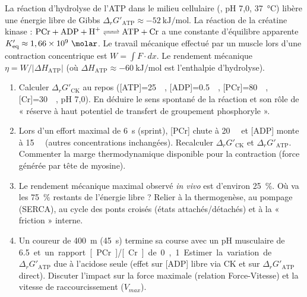 \documentclass[11pt]{article}
\begin{document}
\begin{exercice}
La réaction d'hydrolyse de l'ATP dans le milieu cellulaire (, pH 7,0, \SI{37}{\celsius}) libère une énergie libre de Gibbs $\Delta_r G'_{\text{ATP}} \approx \SI{-52}{\kilo\joule\per\mole}$. La réaction de la créatine kinase : $\ce{PCr + ADP + H+ <=> ATP + Cr}$ a une constante d'équilibre apparente $K'_{\text{eq}} \approx 1,66 \times 10^9\ \SI{}{\per\molar}$.
Le travail mécanique effectué par un muscle lors d'une contraction concentrique est $W = \int F \cdot dx$. Le rendement mécanique $\eta = W / |\Delta H_{\text{ATP}}|$ (où $\Delta H_{\text{ATP}} \approx \SI{-60}{\kilo\joule\per\mole}$ est l'enthalpie d'hydrolyse).

\begin{enumerate}
    \item Calculer $\Delta_r G'_{\text{CK}}$ au repos ([ATP]=\SI{25}{\milli\molar}, [ADP]=\SI{0,5}{\milli\molar}, [PCr]=\SI{80}{\milli\molar}, [Cr]=\SI{30}{\milli\molar}, pH 7,0). En déduire le sens spontané de la réaction et son rôle de « réserve à haut potentiel de transfert de groupement phosphoryle ».
    \item Lors d'un effort maximal de \SI{6}{\second} (sprint), [PCr] chute à \SI{20}{\milli\molar} et [ADP] monte à \SI{15}{\milli\molar} (autres concentrations inchangées). Recalculer $\Delta_r G'_{\text{CK}}$ et $\Delta_r G'_{\text{ATP}}$. Commenter la marge thermodynamique disponible pour la contraction (force générée par tête de myosine).
    \item Le rendement mécanique maximal observé \textit{in vivo} est d'environ \SI{25}{\%}. Où va les \SI{75}{\%} restants de l'énergie libre ? Relier à la thermogenèse, au pompage  (SERCA), au cycle des ponts croisés (états attachés/détachés) et à la « friction » interne.
    \item Un coureur de \SI{400}{\m} (\SI{45}{\second}) termine sa course avec un pH musculaire de \SI{6,5} et un rapport [PCr]/[Cr] de 0,1. Estimer la variation de $\Delta_r G'_{\text{ATP}}$ due à l'acidose seule (effet sur [ADP] libre via CK et sur $\Delta_r G'_{\text{ATP}}$ direct). Discuter l'impact sur la force maximale (relation Force-Vitesse) et la vitesse de raccourcissement ($V_{max}$).
\end{enumerate}
\end{exercice}
\end{document}

